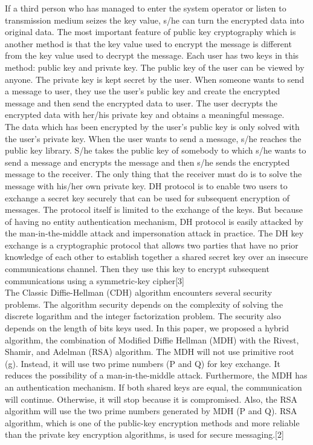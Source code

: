If a third person who has managed to enter the system operator or listen to transmission medium
seizes the  key value,  s/he can turn  the  encrypted data into  original data.  The most  important feature of public key cryptography which is another method is that the key value used to encrypt the message is different from the key value used to decrypt the message. Each user has two keys
in this method: public key and private key. The public key of the user can be viewed by anyone.
The private key is kept secret by the user. When someone wants to send a message to user, they
use the user's public key and create the encrypted message and then send the encrypted data to
user. The user  decrypts the  encrypted data with  her/his private  key  and obtains  a meaningful
message.\\
The data which has been encrypted by the user’s public key is only solved with the user’s private key. When the user wants to send a message, s/he reaches the public key library. S/he takes the public key of somebody to which s/he wants to send a message and encrypts the message and then s/he sends the encrypted message to the receiver. The only thing that the receiver must do is to solve the message with his/her own private key. DH protocol is to enable two users to exchange a secret key securely that can be used for subsequent encryption of messages. The protocol itself is limited to the exchange of the keys. But because of having no entity authentication mechanism, DH protocol is easily attacked by the man-in-the-middle attack and impersonation attack in practice. The DH key exchange is a cryptographic protocol that allows two parties that have no prior knowledge of each other to establish together a shared secret key over an insecure communications channel. Then they use this key to encrypt subsequent communications using a symmetric-key cipher[3]\\
The Classic Diffie-Hellman (CDH) algorithm encounters several security problems. The algorithm security depends on the complexity of solving the discrete logarithm and the integer factorization problem. The security also depends on the length of bits keys used. In this paper, we proposed a hybrid algorithm, the combination of Modified Diffie Hellman (MDH) with the Rivest, Shamir, and Adelman (RSA) algorithm. The MDH will not use primitive root (g). Instead, it will use two prime numbers (P and Q) for key exchange. It reduces the possibility of a man-in-the-middle attack. Furthermore, the MDH has an authentication mechanism. If both shared keys are equal, the communication will continue. Otherwise, it will stop because it is compromised. Also, the RSA algorithm will use the two prime numbers generated by MDH (P and Q). RSA algorithm, which is one of the public-key encryption methods and more reliable than the private key encryption algorithms, is used for secure messaging.[2]\\
